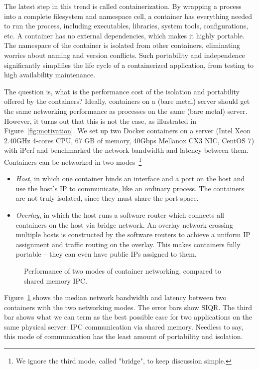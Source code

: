 The latest step in this trend is called containerization.  By wrapping a process
into a complete filesystem and namespace cell, a container has everything needed
to run the process, including executables, libraries, system tools,
configurations, etc. A container has no external dependencies, which makes it
highly portable. The namespace of the container is isolated from other
containers, eliminating worries about naming and version conflicts.  Such
portability and independence significantly simplifies the life cycle of a
containerized application, from testing to high availability maintenance.

The question is, what is the performance cost of the isolation and portability
offered by the containers? Ideally, containers on a (bare metal) server should
get the same networking performance as processes on the same (bare metal)
server. However, it turns out that this is not the case, as illustrated in
Figure~\ref{fig:motivation}.  We set up two Docker
containers on a server (Intel Xeon 2.40GHz 4-cores CPU, 67 GB of memory, 40Gbps Mellanox CX3 NIC, CentOS 7) with iPerf and benchmarked the network bandwidth and latency between
them. Containers can be networked in two modes~\footnote{We ignore the third
mode, called "bridge", to keep discussion simple.} 
\begin{itemize}
\item {\em Host}, in which one container binds an interface and a port on the
    host and use the host's IP to communicate, like an ordinary process. The
    containers are not truly isolated, since they must share the port space.
\item {\em Overlay}, in which the host runs a software router which connects
    all containers on the host via bridge network. An overlay network crossing
    multiple hosts is constructed by the software routers to achieve a uniform
    IP assignment and traffic routing on the overlay. This makes containers
    fully portable -- they can even have public IPs assigned to them.
\end{itemize}

\begin{figure}[ht]
     \centering 
     \label{fig:three_modes}
     \caption{Performance of two modes of container networking, compared to
     shared memory IPC.} 
\end{figure} 

Figure~\ref{fig:three_modes} shows the median network bandwidth and latency
between two containers with the two networking modes. The error bars show SIQR.
The third bar shows what we can term as the best possible case for two
applications on the same physical server: IPC communication via shared memory.
Needless to say, this mode of communication has the least amount of portability
and isolation.

